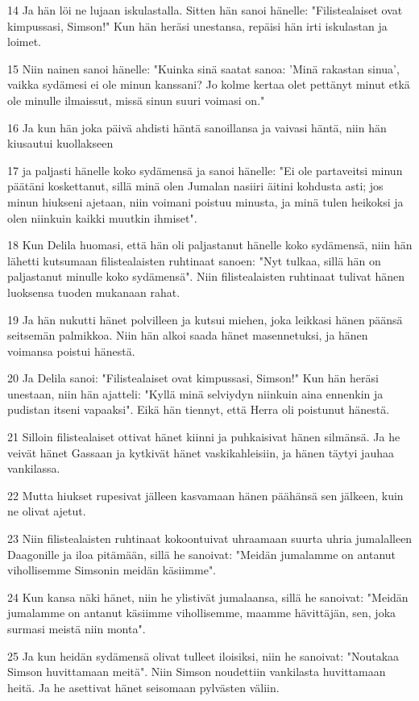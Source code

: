 \par 14 Ja hän löi ne lujaan iskulastalla. Sitten hän sanoi hänelle: "Filistealaiset ovat kimpussasi, Simson!" Kun hän heräsi unestansa, repäisi hän irti iskulastan ja loimet.
\par 15 Niin nainen sanoi hänelle: "Kuinka sinä saatat sanoa: 'Minä rakastan sinua', vaikka sydämesi ei ole minun kanssani? Jo kolme kertaa olet pettänyt minut etkä ole minulle ilmaissut, missä sinun suuri voimasi on."
\par 16 Ja kun hän joka päivä ahdisti häntä sanoillansa ja vaivasi häntä, niin hän kiusautui kuollakseen
\par 17 ja paljasti hänelle koko sydämensä ja sanoi hänelle: "Ei ole partaveitsi minun päätäni koskettanut, sillä minä olen Jumalan nasiiri äitini kohdusta asti; jos minun hiukseni ajetaan, niin voimani poistuu minusta, ja minä tulen heikoksi ja olen niinkuin kaikki muutkin ihmiset".
\par 18 Kun Delila huomasi, että hän oli paljastanut hänelle koko sydämensä, niin hän lähetti kutsumaan filistealaisten ruhtinaat sanoen: "Nyt tulkaa, sillä hän on paljastanut minulle koko sydämensä". Niin filistealaisten ruhtinaat tulivat hänen luoksensa tuoden mukanaan rahat.
\par 19 Ja hän nukutti hänet polvilleen ja kutsui miehen, joka leikkasi hänen päänsä seitsemän palmikkoa. Niin hän alkoi saada hänet masennetuksi, ja hänen voimansa poistui hänestä.
\par 20 Ja Delila sanoi: "Filistealaiset ovat kimpussasi, Simson!" Kun hän heräsi unestaan, niin hän ajatteli: "Kyllä minä selviydyn niinkuin aina ennenkin ja pudistan itseni vapaaksi". Eikä hän tiennyt, että Herra oli poistunut hänestä.
\par 21 Silloin filistealaiset ottivat hänet kiinni ja puhkaisivat hänen silmänsä. Ja he veivät hänet Gassaan ja kytkivät hänet vaskikahleisiin, ja hänen täytyi jauhaa vankilassa.
\par 22 Mutta hiukset rupesivat jälleen kasvamaan hänen päähänsä sen jälkeen, kuin ne olivat ajetut.
\par 23 Niin filistealaisten ruhtinaat kokoontuivat uhraamaan suurta uhria jumalalleen Daagonille ja iloa pitämään, sillä he sanoivat: "Meidän jumalamme on antanut vihollisemme Simsonin meidän käsiimme".
\par 24 Kun kansa näki hänet, niin he ylistivät jumalaansa, sillä he sanoivat: "Meidän jumalamme on antanut käsiimme vihollisemme, maamme hävittäjän, sen, joka surmasi meistä niin monta".
\par 25 Ja kun heidän sydämensä olivat tulleet iloisiksi, niin he sanoivat: "Noutakaa Simson huvittamaan meitä". Niin Simson noudettiin vankilasta huvittamaan heitä. Ja he asettivat hänet seisomaan pylvästen väliin.
